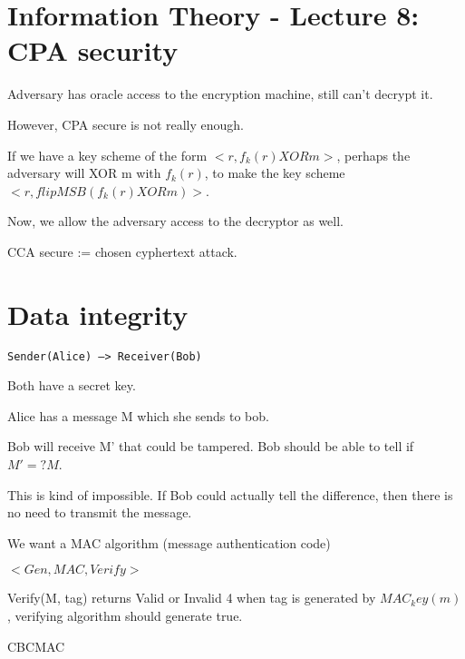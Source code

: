 \section{Information Theory - Lecture 8: CPA security}

Adversary has oracle access to the encryption machine, still can't decrypt it.

However, CPA secure is not really enough.


If we have a key scheme of the form $<r, f_k(r) XOR m>$, perhaps the adversary will
XOR m with $f_k(r)$, to make the key scheme $<r, flipMSB(f_k(r) XOR m)>$.



Now, we allow the adversary access to the decryptor as well.

CCA secure := chosen cyphertext attack.


\section{Data integrity}

\texttt{Sender(Alice) ---> Receiver(Bob)}

Both have a secret key.

Alice has a message M which she sends to bob.

Bob will receive M' that could be tampered. Bob should be able to tell
if $M' =? M$.

This is kind of impossible. If Bob could actually tell the difference,
then there is no need to transmit the message.


We want a MAC algorithm (message authentication code)


$<Gen, MAC, Verify>$

Verify(M, tag) returns Valid or Invalid
4
when tag is generated by $MAC_key(m)$, verifying algorithm should generate true.


CBCMAC
